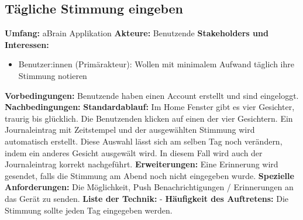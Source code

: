 \subsection{Tägliche Stimmung eingeben }
\textbf{Umfang:} aBrain Applikation \newline \newline
\textbf{Akteure:} Benutzende \newline \newline
\textbf{Stakeholders und Interessen:}  
\begin{itemize}
	\item Benutzer:innen (Primärakteur): Wollen mit minimalem Aufwand täglich ihre Stimmung notieren
\end{itemize}
\textbf{Vorbedingungen:}  Benutzende haben einen Account erstellt und sind eingeloggt. \newline \newline
\textbf{Nachbedingungen:} \newline \newline
\textbf{Standardablauf:} Im Home Fenster gibt es vier Gesichter, traurig bis glücklich. Die Benutzenden klicken auf einen der vier Gesichtern. Ein Journaleintrag mit Zeitstempel und der ausgewählten Stimmung wird automatisch erstellt. Diese Auswahl lässt sich am selben Tag noch verändern, indem ein anderes Gesicht ausgewält wird. In diesem Fall wird auch der Journaleintrag korrekt nachgeführt. \newline \newline
\textbf{Erweiterungen:} Eine Erinnerung wird gesendet, falls die Stimmung am Abend noch nicht eingegeben wurde. \newline \newline
\textbf{Spezielle Anforderungen:} Die Möglichkeit, Push Benachrichtigungen / Erinnerungen an das Gerät zu senden. \newline \newline
\textbf{Liste der Technik:} - \newline \newline
\textbf{Häufigkeit des Auftretens:} Die Stimmung sollte jeden Tag eingegeben werden. \newline \newline

